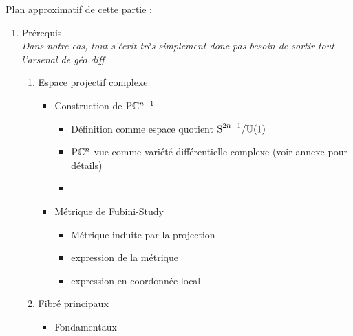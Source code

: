 
Plan approximatif de cette partie :

\begin{enumerate}[label=\Roman* --- ] \bfseries
	
	\item Prérequis \\
	{\normalfont\itshape Dans notre cas, tout s'écrit très simplement donc pas besoin de sortir tout l'arsenal de géo diff}
	\begin{enumerate}[label=\arabic{enumi}.\arabic* --- ]
		
		\item Espace projectif complexe
		\begin{itemize}%
			
			\item Construction de $\text{\normalfont P}\mathbb{C}^{n-1}$ 
			\begin{itemize} \normalfont
				
				\item Définition comme espace quotient $\text{\normalfont S}^{2n-1}/\text{\normalfont U}(1)$
				
				\item $\text{\normalfont P}\mathbb{C}^{n}$ vue comme variété différentielle complexe (voir annexe pour détails)
				
				\item {}
				
			\end{itemize}
			
			\item Métrique de Fubini-Study 
			\begin{itemize} \normalfont
				
				\item Métrique induite par la projection
				
				\item expression de la métrique
				
				\item expression en coordonnée local
				
			\end{itemize}
			
		\end{itemize}
		
		\item Fibré principaux
		\begin{itemize}%
			
			\item Fondamentaux
			\begin{itemize} \normalfont
				

\end{itemize}
\end{itemize}
\end{enumerate}
\end{enumerate}
